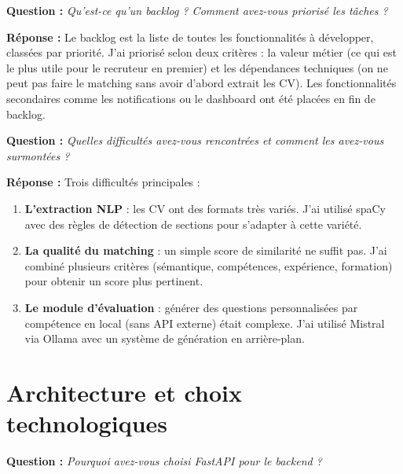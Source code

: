 \documentclass[12pt,a4paper]{article}
\newenvironment{jury}{%
  \def\FrameCommand{\fboxsep=8pt\colorbox{orange!12}}%
  \MakeFramed{\advance\hsize-\width \FrameRestore}%
  \vspace{-4pt}%
}{\endMakeFramed}
\newenvironment{reponse}{%
  \def\FrameCommand{\fboxsep=8pt\colorbox{green!10}}%
  \MakeFramed{\advance\hsize-\width \FrameRestore}%
  \vspace{-4pt}%
}{\endMakeFramed}
\newcommand{\Q}[1]{\vspace{6pt}\noindent\textbf{\color{orange}Question :} \textit{#1}}
\newcommand{\R}[1]{\noindent\textbf{\color{vert}Réponse :} #1\vspace{6pt}}
\begin{document}
\begin{jury}
\Q{Qu'est-ce qu'un backlog ? Comment avez-vous priorisé les tâches ?}
\end{jury}

\begin{reponse}
\R{Le backlog est la liste de toutes les fonctionnalités à développer, classées par priorité.
J'ai priorisé selon deux critères : la valeur métier (ce qui est le plus utile pour le recruteur en premier) et les dépendances techniques (on ne peut pas faire le matching sans avoir d'abord extrait les CV).
Les fonctionnalités secondaires comme les notifications ou le dashboard ont été placées en fin de backlog.}
\end{reponse}

\begin{jury}
\Q{Quelles difficultés avez-vous rencontrées et comment les avez-vous surmontées ?}
\end{jury}

\begin{reponse}
\R{Trois difficultés principales :
\begin{enumerate}[leftmargin=1.5cm]
  \item \textbf{L'extraction NLP} : les CV ont des formats très variés. J'ai utilisé spaCy avec des règles de détection de sections pour s'adapter à cette variété.
  \item \textbf{La qualité du matching} : un simple score de similarité ne suffit pas. J'ai combiné plusieurs critères (sémantique, compétences, expérience, formation) pour obtenir un score plus pertinent.
  \item \textbf{Le module d'évaluation} : générer des questions personnalisées par compétence en local (sans API externe) était complexe. J'ai utilisé Mistral via Ollama avec un système de génération en arrière-plan.
\end{enumerate}}
\end{reponse}

\section{Architecture et choix technologiques}

\begin{jury}
\Q{Pourquoi avez-vous choisi FastAPI pour le backend ?}
\end{jury}
\end{document}
